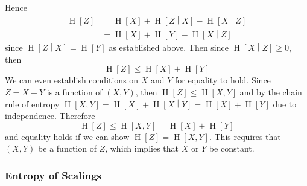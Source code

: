 \documentclass[11pt]{report} %
\begin{document}
Hence
\begin{align}
\operatorname{H}\left[Z\right] &= \operatorname{H}\left[X\right] + \operatorname{H}\left[Z\middle|X\right] - \operatorname{H}\left[X\middle| Z\right] \\
&= \operatorname{H}\left[X\right] + \operatorname{H}\left[Y\right] - \operatorname{H}\left[X\middle| Z\right]
\end{align}
since $\operatorname{H}\left[Z\middle|X\right] = \operatorname{H}\left[Y\right]$ as established above. Then since $\operatorname{H}\left[X\middle| Z\right] \geq 0$, then
\begin{equation}
\operatorname{H}\left[Z\right] \leq \operatorname{H}\left[X\right] + \operatorname{H}\left[Y\right]
\end{equation}
We can even establish conditions on $X$ and $Y$ for equality to hold. Since $Z = X + Y$ is a function of $\left(X, Y\right)$, then $\operatorname{H}\left[Z\right] \leq \operatorname{H}\left[X, Y\right]$ and by the chain rule of entropy $\operatorname{H}\left[X, Y\right] = \operatorname{H}\left[X\right] + \operatorname{H}\left[X\middle| Y\right] = \operatorname{H}\left[X\right] + \operatorname{H}\left[Y\right]$ due to independence. Therefore
\begin{equation}
\operatorname{H}\left[Z\right] \leq \operatorname{H}\left[X, Y\right] = \operatorname{H}\left[X\right] + \operatorname{H}\left[Y\right]
\end{equation}
and equality holds if we can show $\operatorname{H}\left[Z\right] = \operatorname{H}\left[X, Y\right]$. This requires that $\left(X, Y\right)$ be a function of $Z$, which implies that $X$ or $Y$ be constant.

\subsubsection{Entropy of Scalings \cite{Cover2006}}
\end{document}
